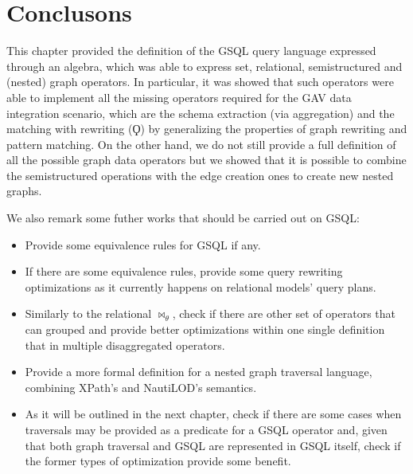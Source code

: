 \section{Conclusons}
This chapter provided the definition of the GSQL query language expressed through an algebra, which was able to express set, relational, semistructured and (nested) graph operators. In particular, it was showed that such operators were able to implement all the missing operators required for the GAV data integration scenario, which are the schema extraction (via aggregation) and the matching with rewriting ($\Qoppa$) by generalizing the properties of graph rewriting and pattern matching. On the other hand, we do not still provide a full definition of all the possible graph data operators but  we showed that it is possible to combine the semistructured operations with the edge creation ones to create new nested graphs. 



We also remark some futher works that should be carried out on GSQL:
\begin{itemize}
\item Provide some equivalence rules for GSQL if any.
\item If there are some equivalence rules, provide some query rewriting optimizations as it currently happens on relational models' query plans. 
\item Similarly to the relational $\bowtie_\theta$, check if there are other set of operators that can grouped and provide better optimizations within one single definition that in multiple disaggregated operators.
\item Provide a more formal definition for a nested graph traversal language, combining XPath's and NautiLOD's semantics.
\item As it will be outlined in the next chapter, check if there are some cases when traversals may be provided as a predicate for a GSQL operator and, given that both graph traversal and GSQL are represented in GSQL itself, check if the former types of optimization provide some benefit.
\end{itemize} 

